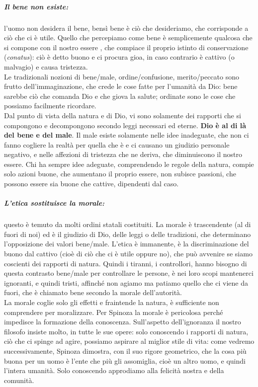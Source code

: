 \subparagraph{Il bene non esiste:}l'uomo non desidera il bene, bensì bene è ciò che desideriamo, che corrisponde a ciò che ci è utile. Quello che percepiamo come bene è semplicemente qualcosa che si compone con il nostro essere , che compiace il proprio istinto di conservazione (\textit{conatus}): ciò è detto buono e ci procura gioa, in caso contrario è cattivo (o malvagio) e causa tristezza.\\
Le tradizionali nozioni di bene/male, ordine/confusione, merito/peccato sono frutto dell'immaginazione, che crede le cose fatte per l'umanità da Dio: bene sarebbe ciò che comanda Dio e che giova la salute; ordinate sono le cose che possiamo facilmente ricordare.\\
Dal punto di vista della natura e di Dio, vi sono solamente dei rapporti che si compongono e decompongono secondo leggi necessari ed eterne. \textbf{Dio è al di là del bene e del male}. Il male esiste solamente nelle idee inadeguate, che non ci fanno cogliere la realtà per quella che è e ci causano un giudizio personale negativo, e nelle affezioni di tristezza che ne deriva, che diminuiscono il nostro essere. Chi ha sempre idee adeguate, comprendendo le regole della natura, compie solo azioni buone, che aumentano il proprio essere, non subisce passioni, che possono essere sia buone che cattive, dipendenti dal caso.
\subparagraph{L'etica sostituisce la morale:}questo è  temuto da molti ordini statali costituiti. La morale è trascendente (al di fuori di noi) ed è il giudizio di Dio, delle leggi  o delle tradizioni, che determinano l'opposizione dei valori bene/male. L'etica è immanente, è la discriminazione del buono dal cattivo (cioè di ciò che ci è utile oppure no), che può avvenire se siamo coscienti dei rapporti di natura. Quindi i tiranni, i controllori, hanno bisogno di questa contrasto bene/male per controllare le persone, è nei loro scopi mantenerci ignoranti, e quindi tristi, affinché non agiamo ma patiamo quello che ci viene da fuori, che è chiamato bene secondo la morale dell'autorità.\\
La morale coglie solo gli effetti e fraintende la natura, è sufficiente non comprendere per moralizzare. Per Spinoza la morale è pericolosa perché impedisce la formazione della conoscenza. Sull'aspetto dell'ignoranza il nostro filosofo insiste molto, in tutte le sue opere: solo conoscendo i rapporti di natura, ciò che ci spinge ad agire, possiamo aspirare al miglior stile di vita: come vedremo successivamente, Spinoza dimostra, con il suo rigore geometrico, che la cosa più buona per un uomo è l'ente che più gli assomiglia, cioè un altro uomo, e quindi l'intera umanità. Solo conoscendo approdiamo alla felicità nostra e della comunità.
